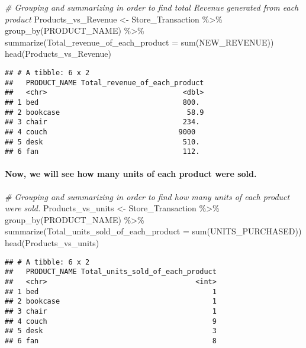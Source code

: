 \documentclass[
]{article}
\newenvironment{Shaded}{\begin{snugshade}}{\end{snugshade}}
\newcommand{\AttributeTok}[1]{\textcolor[rgb]{0.77,0.63,0.00}{#1}}
\newcommand{\CommentTok}[1]{\textcolor[rgb]{0.56,0.35,0.01}{\textit{#1}}}
\newcommand{\FunctionTok}[1]{\textcolor[rgb]{0.00,0.00,0.00}{#1}}
\newcommand{\NormalTok}[1]{#1}
\newcommand{\OtherTok}[1]{\textcolor[rgb]{0.56,0.35,0.01}{#1}}
\newcommand{\SpecialCharTok}[1]{\textcolor[rgb]{0.00,0.00,0.00}{#1}}
\begin{document}
\begin{Shaded}
\begin{Highlighting}[]
\CommentTok{\# Grouping and summarizing in order to find total Revenue generated from each product}
\NormalTok{Products\_vs\_Revenue }\OtherTok{\textless{}{-}}\NormalTok{ Store\_Transaction }\SpecialCharTok{\%\textgreater{}\%} \FunctionTok{group\_by}\NormalTok{(PRODUCT\_NAME) }\SpecialCharTok{\%\textgreater{}\%}
  \FunctionTok{summarize}\NormalTok{(}\AttributeTok{Total\_revenue\_of\_each\_product =} \FunctionTok{sum}\NormalTok{(NEW\_REVENUE)) }
\FunctionTok{head}\NormalTok{(Products\_vs\_Revenue)}
\end{Highlighting}
\end{Shaded}

\begin{verbatim}
## # A tibble: 6 x 2
##   PRODUCT_NAME Total_revenue_of_each_product
##   <chr>                                <dbl>
## 1 bed                                  800. 
## 2 bookcase                              58.9
## 3 chair                                234. 
## 4 couch                               9000  
## 5 desk                                 510. 
## 6 fan                                  112.
\end{verbatim}

\hypertarget{now-we-will-see-how-many-units-of-each-product-were-sold.}{%
\paragraph{Now, we will see how many units of each product were
sold.}\label{now-we-will-see-how-many-units-of-each-product-were-sold.}}

\begin{Shaded}
\begin{Highlighting}[]
\CommentTok{\# Grouping and summarizing in order to find how many units of each product were sold.}
\NormalTok{Products\_vs\_units }\OtherTok{\textless{}{-}}\NormalTok{ Store\_Transaction }\SpecialCharTok{\%\textgreater{}\%} \FunctionTok{group\_by}\NormalTok{(PRODUCT\_NAME) }\SpecialCharTok{\%\textgreater{}\%}
  \FunctionTok{summarize}\NormalTok{(}\AttributeTok{Total\_units\_sold\_of\_each\_product =} \FunctionTok{sum}\NormalTok{(UNITS\_PURCHASED))}
\FunctionTok{head}\NormalTok{(Products\_vs\_units)}
\end{Highlighting}
\end{Shaded}

\begin{verbatim}
## # A tibble: 6 x 2
##   PRODUCT_NAME Total_units_sold_of_each_product
##   <chr>                                   <int>
## 1 bed                                         1
## 2 bookcase                                    1
## 3 chair                                       1
## 4 couch                                       9
## 5 desk                                        3
## 6 fan                                         8
\end{verbatim}
\end{document}

